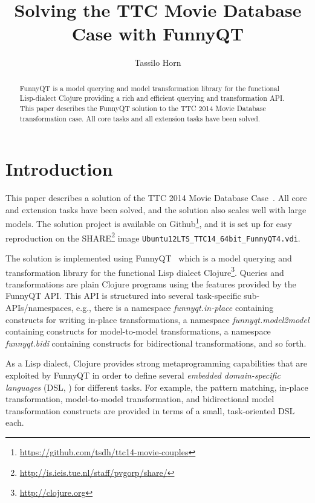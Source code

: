 \documentclass[submission]{eptcs}
\title{Solving the TTC Movie Database Case with FunnyQT}
\author{Tassilo Horn
  \institute{Institute for Software Technology, University Koblenz-Landau, Germany}
  \email{horn@uni-koblenz.de}}
\begin{document}
\maketitle

\begin{abstract}
  FunnyQT is a model querying and model transformation library for the
  functional Lisp-dialect Clojure providing a rich and efficient querying and
  transformation API.  This paper describes the FunnyQT solution to the TTC
  2014 Movie Database transformation case.  All core tasks and all extension
  tasks have been solved.
\end{abstract}


\section{Introduction}
\label{sec:introduction}

This paper describes a solution of the TTC 2014 Movie Database
Case~\cite{movies-case-desc}.  All core and extension tasks have been solved,
and the solution also scales well with large models.  The solution project is
available on
Github\footnote{\url{https://github.com/tsdh/ttc14-movie-couples}}, and it is
set up for easy reproduction on the
SHARE\footnote{\url{http://is.ieis.tue.nl/staff/pvgorp/share/}} image
\texttt{Ubuntu12LTS\_TTC14\_64bit\_FunnyQT4.vdi}.

The solution is implemented using FunnyQT~\cite{Horn2013MQWFQ} which is a model
querying and transformation library for the functional Lisp dialect
Clojure\footnote{\url{http://clojure.org}}.  Queries and transformations are
plain Clojure programs using the features provided by the FunnyQT API.  This
API is structured into several task-specific sub-APIs/namespaces, e.g., there
is a namespace \emph{funnyqt.in-place} containing constructs for writing
in-place transformations, a namespace \emph{funnyqt.model2model} containing
constructs for model-to-model transformations, a namespace \emph{funnyqt.bidi}
containing constructs for bidirectional transformations, and so forth.

As a Lisp dialect, Clojure provides strong metaprogramming capabilities that
are exploited by FunnyQT in order to define several \emph{embedded
  domain-specific languages} (DSL, \cite{book:Fowler2010DSL}) for different
tasks.  For example, the pattern matching, in-place transformation,
model-to-model transformation, and bidirectional model transformation
constructs are provided in terms of a small, task-oriented DSL each.
\end{document}
